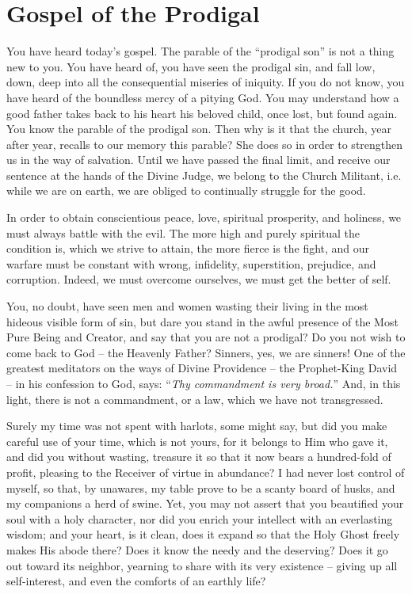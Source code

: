 \chapter{Gospel of the Prodigal}


You have heard today's gospel. The 
parable of the ``prodigal son'' is not a thing 
new to you. You have heard of, you have seen 
the prodigal sin, and fall low, down, deep into 
all the consequential miseries of iniquity. If 
you do not know, you have heard of the boundless
mercy of a pitying God. You may understand
how a good father takes back to his heart 
his beloved child, once lost, but found again. 
You know the parable of the prodigal son. 
Then why is it that the church, year after year, 
recalls to our memory this parable? She does 
so in order to strengthen us in the way of salvation.
Until we have passed the final limit, and 
receive our sentence at the hands of the Divine 
Judge, we belong to the Church Militant, i.e. 
while we are on earth, we are obliged to continually
struggle for the good. 

In order to obtain conscientious peace, love,
spiritual prosperity, and holiness, we must 
always battle with the evil. The more high 
and purely spiritual the condition is, which we 
strive to attain, the more fierce is the fight, and 
our warfare must be constant with wrong, infidelity,
superstition, prejudice, and corruption. 
Indeed, we must overcome ourselves, we must 
get the better of self. 

You, no doubt, have seen men and women 
wasting their living in the most hideous visible 
form of sin, but dare you stand in the awful 
presence of the Most Pure Being and Creator, 
and say that you are not a prodigal? Do you 
not wish to come back to God -- the Heavenly 
Father? Sinners, yes, we are sinners! One of 
the greatest meditators on the ways of Divine 
Providence -- the Prophet-King David -- in his 
confession to God, says: ``\textit{Thy commandment 
is very broad.}'' And, in this light, there is not 
a commandment, or a law, which we have not 
transgressed. 

Surely my time was not spent with harlots, 
some might say, but did you make careful use 
of your time, which is not yours, for it belongs 
to Him who gave it, and did you without wasting, 
treasure it so that it now bears a hundred-fold 
of profit, pleasing to the Receiver of virtue in
abundance? I had never lost control of myself, 
so that, by unawares, my table prove to be a 
scanty board of husks, and my companions a 
herd of swine. Yet, you may not assert that 
you beautified your soul with a holy character, 
nor did you enrich your intellect with an everlasting
wisdom; and your heart, is it clean, does 
it expand so that the Holy Ghost freely makes 
His abode there? Does it know the needy and 
the deserving? Does it go out toward its neighbor,
yearning to share with its very existence -- 
giving up all self-interest, and even the comforts
of an earthly life? 

